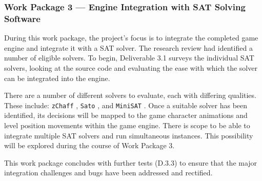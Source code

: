 \documentclass[a4paper]{article}
\begin{document}








\subsubsection{Work Package 3 --- Engine Integration with SAT Solving Software}

During this work package, the project's focus is to integrate the completed game engine and
integrate it with a SAT solver. The research review had identified a number of eligible solvers. To
begin, Deliverable 3.1 surveys the individual SAT solvers, looking at the source code and
evaluating the ease with which the solver can be integrated into the engine.

There are a number of different solvers to evaluate, each with differing qualities. These include:
\texttt{zChaff} \cite{fu2004zchaff}, \texttt{Sato} \cite{zhang1997sato}, and \texttt{MiniSAT}
\cite{sorensson2005minisat}. Once a suitable solver has been identified, its decisions will be mapped
to the game character animations and level position movements within the game engine. There is scope
to be able to integrate multiple SAT solvers and run simultaneous instances. This possibility will
be explored during the course of Work Package 3.

This work package concludes with further tests (D.3.3) to ensure that the
major integration challenges and bugs have been addressed and rectified.

\end{document}
